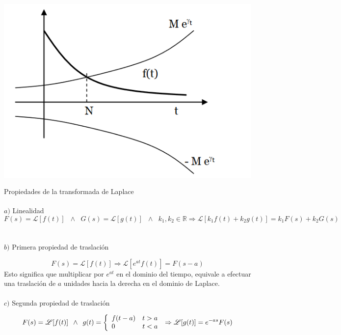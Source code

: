 \documentclass[]{article}
\begin{document}
\includegraphics{../../../Imagenes/Superior/Superior01.PNG}

\large Propiedades de la transformada de Laplace
\normalsize
\\
\\
$a)$ Linealidad
$$
F(s) = \mathscr{L}[f(t)]\hspace{7pt} \wedge\hspace{7pt} G(s) = \mathscr{L}[g(t)]\hspace{7pt} \wedge\hspace{7pt} k_{1} , k_{2} \in \mathbb{R} \Rightarrow \mathscr{L}[k_{1}f(t) + k_{2}g(t)] = k_{1} F(s) + k_{2} G(s)
$$
\\
\\
$b)$ Primera propiedad de traslación

$$
F(s) = \mathscr{L}[f(t)] \Rightarrow \mathscr{L}[e^{at}f(t)] = F(s-a)
$$
Esto significa que multiplicar por $e^{at}$ en el dominio del tiempo, equivale a efectuar una traslación de $a$ unidades hacia la derecha en el dominio de Laplace.
\\
\\
$c)$ Segunda propiedad de traslación

$$
F(s) = \mathscr{L}[f(t)] \hspace{5pt} \wedge \hspace{5pt} g(t) = \left\{
	\begin{array}{ll}
		f(t-a) \hspace{10pt} t > a \\
		0 \hspace{40pt} t < a
	\end{array}
\right. \\
\Rightarrow \mathscr{L}[g(t)] = e^{-as}F(s)
$$
\end{document}

